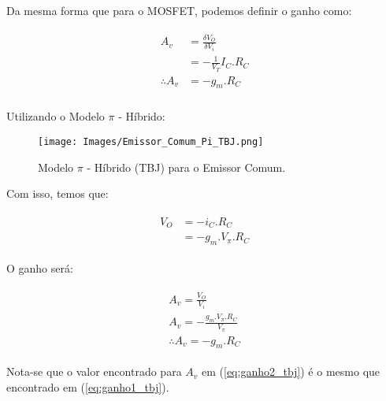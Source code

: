 \documentclass[12pt]{article}
\begin{document}
Da mesma forma que para o MOSFET, podemos definir o ganho como:

\begin{align}
  \begin{split}
    A_v &= \frac{\delta V_O}{\delta V_i} \\
        &= - \frac{1}{V_T} I_C . R_C \\[0.4cm]
    \therefore A_v &= -g_m . R_C \\
  \end{split}
  \label{eq:ganho1_tbj}
\end{align}

Utilizando o Modelo $\pi$ - Híbrido:


\begin{figure}[H]
  \begin{center}
    \texttt{[image: Images/Emissor\_Comum\_Pi\_TBJ.png]}
  \end{center}
  \caption{Modelo $\pi$ - Híbrido (TBJ) para o Emissor Comum.}
\end{figure}

Com isso, temos que:


\begin{align*}
  \begin{split}
    V_O &= -i_C . R_C \\
        &= -g_m . V_{\pi} . R_C
  \end{split}
\end{align*}

O ganho será:

\begin{align}
  \begin{split}
    A_v = \frac{V_O}{V_i} \\
    A_v = - \frac{g_m . V_{\pi} . R_C}{V_{\pi}} \\[0.4cm]
    \therefore A_v = -g_m . R_C
  \end{split}
  \label{eq:ganho2_tbj}
\end{align}

Nota-se que o valor encontrado para $A_v$ em (\ref{eq:ganho2_tbj}) é o mesmo que encontrado em (\ref{eq:ganho1_tbj}).
\end{document}
